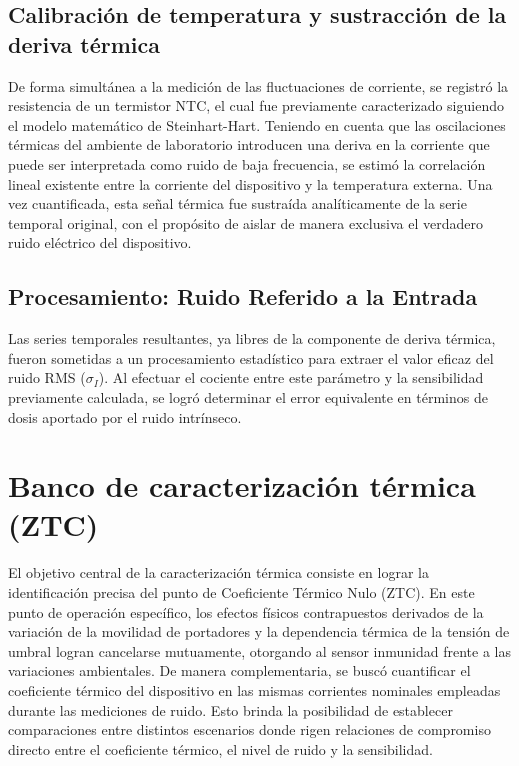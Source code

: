 \documentclass[12pt,a4paper,oneside]{book}
\begin{document}
\subsection{Calibración de temperatura y sustracción de la deriva térmica}
De forma simultánea a la medición de las fluctuaciones de corriente, se registró la resistencia de un termistor NTC, el cual fue previamente caracterizado siguiendo el modelo matemático de Steinhart-Hart. Teniendo en cuenta que las oscilaciones térmicas del ambiente de laboratorio introducen una deriva en la corriente que puede ser interpretada como ruido de baja frecuencia, se estimó la correlación lineal existente entre la corriente del dispositivo y la temperatura externa. Una vez cuantificada, esta señal térmica fue sustraída analíticamente de la serie temporal original, con el propósito de aislar de manera exclusiva el verdadero ruido eléctrico del dispositivo.

\subsection{Procesamiento: Ruido Referido a la Entrada}
Las series temporales resultantes, ya libres de la componente de deriva térmica, fueron sometidas a un procesamiento estadístico para extraer el valor eficaz del ruido RMS ($\sigma_I$). Al efectuar el cociente entre este parámetro y la sensibilidad previamente calculada, se logró determinar el error equivalente en términos de dosis aportado por el ruido intrínseco.

\section{Banco de caracterización térmica (ZTC)}
El objetivo central de la caracterización térmica consiste en lograr la identificación precisa del punto de Coeficiente Térmico Nulo (ZTC). En este punto de operación específico, los efectos físicos contrapuestos derivados de la variación de la movilidad de portadores y la dependencia térmica de la tensión de umbral logran cancelarse mutuamente, otorgando al sensor inmunidad frente a las variaciones ambientales. De manera complementaria, se buscó cuantificar el coeficiente térmico del dispositivo en las mismas corrientes nominales empleadas durante las mediciones de ruido. Esto brinda la posibilidad de establecer comparaciones entre distintos escenarios donde rigen relaciones de compromiso directo entre el coeficiente térmico, el nivel de ruido y la sensibilidad.
\end{document}
